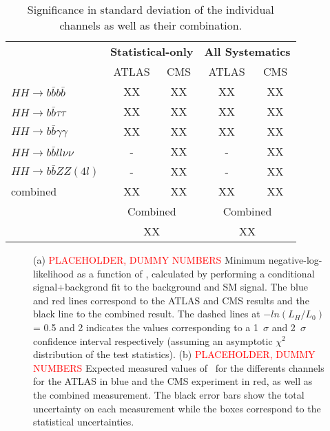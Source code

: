 \begin{table}[htb!]
\begin{center}
\begin{tabular}{lcccc} \toprule
 & \multicolumn{2}{c}{\textbf{Statistical-only}} & \multicolumn{2}{c}{\textbf{All Systematics}}\\
 & ATLAS & CMS & ATLAS & CMS \\
\hline
$HH \rightarrow b\bar{b}b\bar{b}$ & XX & XX & XX & XX \\
$HH \rightarrow b\bar{b}\tau\tau$ & XX & XX & XX & XX \\
$HH \rightarrow b\bar{b}\gamma\gamma$ & XX & XX & XX & XX \\
$HH \rightarrow b\bar{b}ll\nu\nu$ & - & XX & - & XX \\
$HH \rightarrow b\bar{b}ZZ(4l)$ & - & XX & - & XX \\
combined &  XX & XX & XX & XX \\
\hline
 &  \multicolumn{2}{c}{Combined} & \multicolumn{2}{c}{Combined}\\
 &  \multicolumn{2}{c}{XX} & \multicolumn{2}{c}{XX}\\
\bottomrule
\end{tabular}
\end{center}
\caption{Significance in standard deviation of the individual channels as well as their combination.}
\label{tab:comb_significance}
\end{table}



\begin{figure}[!htb]
\centering 
{} 
\caption{(a) \textcolor{red}{PLACEHOLDER, DUMMY NUMBERS} Minimum negative-log-likelihood as a function of \kl, calculated by performing a conditional signal+backgrond fit to the background and SM signal. The blue and red lines correspond to the ATLAS and CMS results and the black line to the combined result. The dashed lines at $-ln(L_{H}/L_{0})$ = 0.5 and 2 indicates the values corresponding to a 1~$\sigma$ and 2~$\sigma$ confidence interval respectively (assuming an asymptotic $\chi^{2}$ distribution of the test statistics). (b) \textcolor{red}{PLACEHOLDER, DUMMY NUMBERS} Expected measured values of \kl\ for the differents channels for the ATLAS in blue and the CMS experiment in red, as well as the combined measurement. The black error bars show the total uncertainty on each measurement while the boxes correspond to the statistical uncertainties.} 
\label{fig:comb_HH} 
\end{figure}
